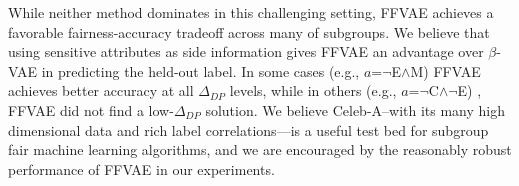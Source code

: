 While neither method dominates in this challenging setting, FFVAE achieves a favorable fairness-accuracy tradeoff across many of subgroups.
We believe that using sensitive attributes as side information gives FFVAE an advantage over $\beta$-VAE in predicting the held-out label.
In some cases (e.g., $a$=$\neg$E$\wedge$M) FFVAE achieves better accuracy at all $\Delta_{DP}$ levels, while in others (e.g., $a$=$\neg$C$\wedge\neg$E)
, FFVAE did not find a low-$\Delta_{DP}$ solution.
We believe Celeb-A--with its many high dimensional data and rich label correlations---is a useful test bed for subgroup fair machine learning algorithms, and we are encouraged by the reasonably robust performance of FFVAE in our experiments.
